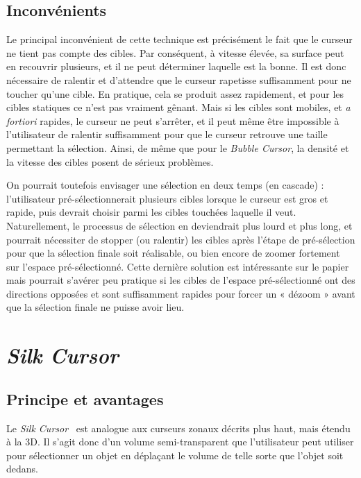 	\subsection{Inconvénients}
	Le principal inconvénient de cette technique est précisément le fait que le curseur ne tient pas compte des cibles. Par conséquent, à vitesse élevée, sa surface peut en recouvrir plusieurs, et il ne peut déterminer laquelle est la bonne. Il est donc nécessaire de ralentir et d'attendre que le curseur rapetisse suffisamment pour ne toucher qu'une cible. En pratique, cela se produit assez rapidement, et pour les cibles statiques ce n'est pas vraiment gênant. Mais si les cibles sont mobiles, et \emph{a fortiori} rapides, le curseur ne peut s'arrêter, et il peut même être impossible à l'utilisateur de ralentir suffisamment pour que le curseur retrouve une taille permettant la sélection. Ainsi, de même que pour le \emph{Bubble Cursor}, la densité et la vitesse des cibles posent de sérieux problèmes.

	On pourrait toutefois envisager une sélection en deux temps (en cascade) : l'utilisateur pré-sélectionnerait plusieurs cibles lorsque le curseur est gros et rapide, puis devrait choisir parmi les cibles touchées laquelle il veut. Naturellement, le processus de sélection en deviendrait plus lourd et plus long, et pourrait nécessiter de stopper (ou ralentir) les cibles après l'étape de pré-sélection pour que la sélection finale soit réalisable, ou bien encore de zoomer fortement sur l'espace pré-sélectionné. Cette dernière solution est intéressante sur le papier mais pourrait s'avérer peu pratique si les cibles de l'espace pré-sélectionné ont des directions opposées et sont suffisamment rapides pour forcer un « dézoom » avant que la sélection finale ne puisse avoir lieu.
	
\section{\emph{Silk Cursor}}
	\subsection{Principe et avantages}
	Le \emph{Silk Cursor}~\cite{zhai1994silk} est analogue aux curseurs zonaux décrits plus haut, mais étendu à la 3D. Il s'agit donc d'un volume semi-transparent que l'utilisateur peut utiliser pour sélectionner un objet en déplaçant le volume de telle sorte que l'objet soit dedans.
	
